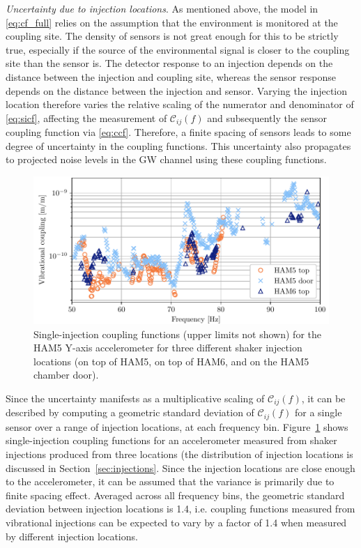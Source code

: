 \textit{Uncertainty due to injection locations}.
As mentioned above, the model in \cref{eq:cf_full} relies on the assumption that the environment is monitored at the coupling site.
The density of sensors is not great enough for this to be strictly true, especially if the source of the environmental signal is closer to the coupling site than the sensor is.
The detector response to an injection depends on the distance between the injection and coupling site, whereas the sensor response depends on the distance between the injection and sensor.
Varying the injection location therefore varies the relative scaling of the numerator and denominator of \cref{eq:sicf}, affecting the measurement of $\mathcal{C}_{ij}(f)$ and subsequently the sensor coupling function via \cref{eq:ccf}.
Therefore, a finite spacing of sensors leads to some degree of uncertainty in the coupling functions.
This uncertainty also propagates to projected noise levels in the \ac{GW} channel using these coupling functions.

\begin{figure}[h!]
	\centering
	\includegraphics{figures/noise-methods/cf-locations-vib.pdf}
	\caption{
		Single-injection coupling functions (upper limits not shown) for the HAM5 Y-axis accelerometer for three different shaker injection locations (on top of HAM5, on top of HAM6, and on the HAM5 chamber door).}
	\label{fig:cf-locations-vib}
\end{figure}

Since the uncertainty manifests as a multiplicative scaling of $\mathcal{C}_{ij}(f)$, it can be described by computing a geometric standard deviation of $\mathcal{C}_{ij}(f)$ for a single sensor over a range of injection locations, at each frequency bin.
Figure~\ref{fig:cf-locations-vib} shows single-injection coupling functions for an accelerometer measured from shaker injections produced from three locations (the distribution of injection locations is discussed in Section~\ref{sec:injections}.
Since the injection locations are close enough to the accelerometer, it can be assumed that the variance is primarily due to finite spacing effect.
Averaged across all frequency bins, the geometric standard deviation between injection locations is 1.4, i.e. coupling functions measured from vibrational injections can be expected to vary by a factor of 1.4 when measured by different injection locations.

